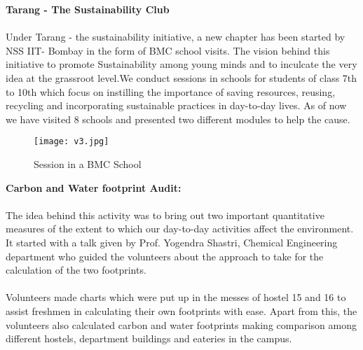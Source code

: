 \noindent \textbf{\Large \linebreak \linebreak Tarang - The Sustainability Club
}\\ \\
Under Tarang - the sustainability initiative, a new chapter has been started by NSS IIT- Bombay in the form of BMC school visits. The vision behind this initiative to promote Sustainability among young minds and to inculcate the very idea at the grassroot level.We conduct sessions in schools for students of class 7th to 10th which focus on instilling the importance of saving resources, reusing, recycling and incorporating sustainable practices in day-to-day lives.
As of now we have visited 8 schools and presented two different modules to help the cause.

\begin{figure}[H]
\centering
\texttt{[image: v3.jpg]}
\caption*{Session in a BMC School}
\end{figure}

\noindent \textbf{\Large \linebreak Carbon and Water footprint Audit:}\\ \\
The idea behind this activity was to bring out two important quantitative measures of the extent to which our day-to-day activities affect the environment. It started with a talk given by Prof. Yogendra Shastri, Chemical Engineering department who guided the volunteers about the approach to take for the calculation of the two footprints.\\ \\
Volunteers made charts which were put up in the messes of hostel 15 and 16 to assist freshmen in calculating their own footprints with ease. Apart from this, the volunteers also calculated carbon and water footprints making comparison among different hostels, department buildings and eateries in the campus.
\\ \\

